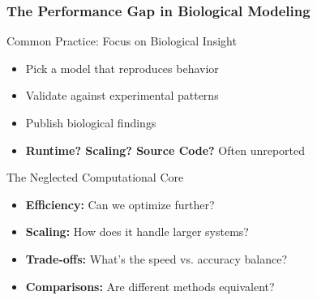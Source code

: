 \documentclass[10pt,t]{beamer}
\begin{document}
\begin{frame}
    \frametitle{The Performance Gap in Biological Modeling}

    \begin{block}{Common Practice: Focus on Biological Insight}
        \begin{itemize}
            \item Pick a model that reproduces behavior
            \item Validate against experimental patterns
            \item Publish biological findings
            \item \textbf{Runtime? Scaling? Source Code?} Often unreported
        \end{itemize}
    \end{block}

    \vspace{0.1cm}

    \begin{alertblock}{The Neglected Computational Core}
        \begin{itemize}
            \item \textbf{Efficiency:} Can we optimize further?
            \item \textbf{Scaling:} How does it handle larger systems?
            \item \textbf{Trade-offs:} What's the speed vs. accuracy balance?
            \item \textbf{Comparisons:} Are different methods equivalent?
        \end{itemize}
    \end{alertblock}
\end{frame}
\end{document}
